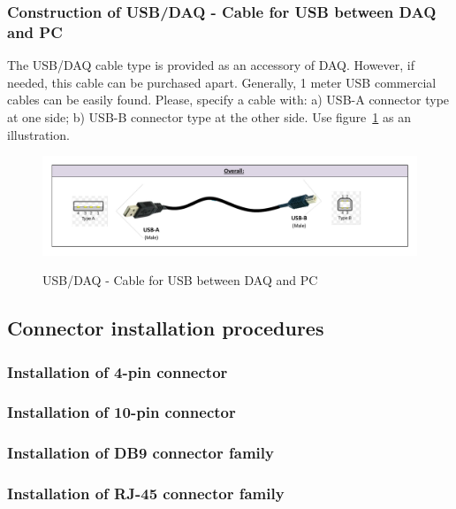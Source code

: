 \subsubsection{Construction of USB/DAQ - Cable for USB between DAQ and PC} \label{CONSTRUCTION:USBDAQ}
The USB/DAQ cable type is provided as an accessory of DAQ. However, if needed, this cable can be purchased apart. Generally, 1 meter USB commercial cables can be easily found. Please, specify a cable with: a) USB-A connector type at one side; b) USB-B connector type at the other side. Use figure~\ref{FIG:USBDAQconstruction} as an illustration.
\begin{figure}
  \centering
  \includegraphics[angle=90,width=1\columnwidth]{figs/body03/FIGUSBDAQconstruction.pdf}\\
  \caption[USB/DAQ - Cable for USB between DAQ and PC]{USB/DAQ - Cable for USB between DAQ and PC}
  \label{FIG:USBDAQconstruction}
\end{figure}

\subsection{Connector installation procedures}
\subsubsection{Installation of 4-pin connector} \label{CRIMPING4pin}
\subsubsection{Installation of 10-pin connector} \label{CRIMPING10pin}
\subsubsection{Installation of DB9 connector family} \label{CRIMPINGDB9}
\subsubsection{Installation of RJ-45 connector family} \label{CRIMPINGRJ45}

